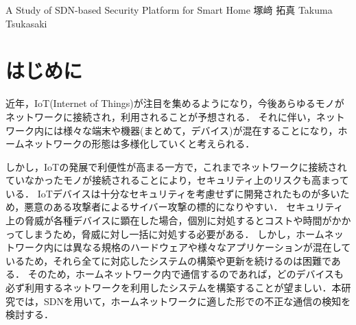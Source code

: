 \documentclass[a4paper,10pt,twocolumn,uplatex]{jsarticle}
\date{9}
\begin{document}
{A Study of SDN-based Security Platform for Smart Home}
{塚﨑 拓真}
{Takuma Tsukasaki}

\section{はじめに}
近年，IoT(Internet of Things)が注目を集めるようになり，今後あらゆるモノがネットワークに接続され，利用されることが予想される．
それに伴い，ネットワーク内には様々な端末や機器(まとめて，デバイス)が混在することになり，ホームネットワークの形態は多様化していくと考えられる．\par
しかし，IoTの発展で利便性が高まる一方で，これまでネットワークに接続されていなかったモノが接続されることにより，セキュリティ上のリスクも高まっている\cite{guideline}．
IoTデバイスは十分なセキュリティを考慮せずに開発されたものが多いため，悪意のある攻撃者によるサイバー攻撃の標的になりやすい．
セキュリティ上の脅威が各種デバイスに顕在した場合，個別に対処するとコストや時間がかかってしまうため，脅威に対し一括に対処する必要がある．
しかし，ホームネットワーク内には異なる規格のハードウェアや様々なアプリケーションが混在しているため，それら全てに対応したシステムの構築や更新を続けるのは困難である．
そのため，ホームネットワーク内で通信するのであれば，どのデバイスも必ず利用するネットワークを利用したシステムを構築することが望ましい．本研究では，SDNを用いて，ホームネットワークに適した形での不正な通信の検知を検討する．

\end{document}
